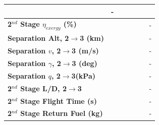 \begin{table}[ht]
\begin{tabular}{l c c c c c c}
		& -
		\\
		\hline 
		\textbf{2$^{nd}$ Stage $\eta_{exergy}$ (\%)}
		& \textbf{\secondExergyEffISPThreeNinety}
		& \textbf{\secondExergyEffISPThreeNinetyFive}
		& \textbf{\secondExergyEffISPThreeStandard}
		& \textbf{\secondExergyEffISPThreeOneHundredFive}
		& \textbf{\secondExergyEffISPThreeOneHundredTen}
		& -
		\\
		\textbf{Separation Alt, 2$\rightarrow$3 (km)}
		& \secondthirdSeparationAltISPThreeNinety
		& \secondthirdSeparationAltISPThreeNinetyFive
		& \secondthirdSeparationAltISPThreeStandard
		& \secondthirdSeparationAltISPThreeOneHundredFive
		& \secondthirdSeparationAltISPThreeOneHundredTen
		& -
		\\
		\textbf{Separation $v$, 2$\rightarrow$3 (m/s)}
		& \secondthirdSeparationvISPThreeNinety
		& \secondthirdSeparationvISPThreeNinetyFive
		& \secondthirdSeparationvISPThreeStandard
		& \secondthirdSeparationvISPThreeOneHundredFive
		& \secondthirdSeparationvISPThreeOneHundredTen
		& -
		\\
		\textbf{Separation $\gamma$, 2$\rightarrow$3 (deg)}
		& \secondthirdSeparationgammaISPThreeNinety
		& \secondthirdSeparationgammaISPThreeNinetyFive
		& \secondthirdSeparationgammaISPThreeStandard
		& \secondthirdSeparationgammaISPThreeOneHundredFive
		& \secondthirdSeparationgammaISPThreeOneHundredTen
		& -
		\\
		\textbf{Separation $q$, 2$\rightarrow$3(kPa)}
		& \secondthirdSeparationqISPThreeNinety
		& \secondthirdSeparationqISPThreeNinetyFive
		& \secondthirdSeparationqISPThreeStandard
		& \secondthirdSeparationqISPThreeOneHundredFive
		& \secondthirdSeparationqISPThreeOneHundredTen
		& -
		\\
		\textbf{2$^{nd}$ Stage L/D, 2$\rightarrow$3}
		& \secondthirdSeparationLDISPThreeNinety
		& \secondthirdSeparationLDISPThreeNinetyFive
		& \secondthirdSeparationLDISPThreeStandard
		& \secondthirdSeparationLDISPThreeOneHundredFive
		& \secondthirdSeparationLDISPThreeOneHundredTen
		& -
		\\
		\textbf{2$^{nd}$ Stage Flight Time (s)}
		& \secondFlightTimeISPThreeNinety
		& \secondFlightTimeISPThreeNinetyFive
		& \secondFlightTimeISPThreeStandard
		& \secondFlightTimeISPThreeOneHundredFive
		& \secondFlightTimeISPThreeOneHundredTen
		& -
		\\
		\textbf{2$^{nd}$ Stage Return Fuel (kg)}
		& \returnFuelISPThreeNinety
		& \returnFuelISPThreeNinetyFive
		& \returnFuelISPThreeStandard
		& \returnFuelISPThreeOneHundredFive
		& \returnFuelISPThreeOneHundredTen
		& -

\end{tabular}
\end{table}
